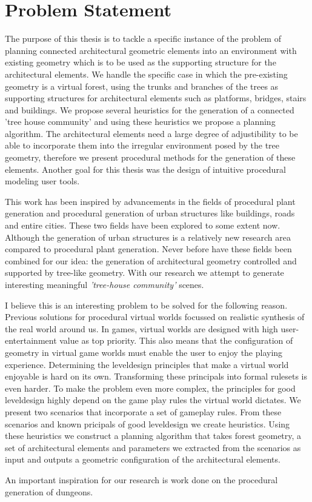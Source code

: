 \chapter{Problem Statement}
\label{sec:problem}


The purpose of this thesis is to tackle a specific instance of the problem of planning connected architectural geometric elements into an environment with existing geometry which is to be used as the supporting structure for the architectural elements. We handle the specific case in which the pre-existing geometry is a virtual forest, using the trunks and branches of the trees as supporting structures for architectural elements such as platforms, bridges, stairs and buildings. We propose several heuristics for the generation of a connected 'tree house community' and using these heuristics we propose a planning algorithm. The architectural elements need a large degree of adjustibility to be able to incorporate them into the irregular environment posed by the tree geometry, therefore we present procedural methods for the generation of these elements. Another goal for this thesis was the design of intuitive procedural modeling user tools.      

This work has been inspired by advancements in the fields of procedural plant generation and procedural generation of urban structures like buildings, roads and entire cities. These two fields have been explored to some extent now. Although the generation of urban structures is a relatively new research area compared to procedural plant generation. Never before have these fields been combined for our idea: the generation of architectural geometry controlled and supported by tree-like geometry. With our research we attempt to 
generate interesting meaningful \emph{'tree-house community'} scenes.

I believe this is an interesting problem to be solved for the following reason. Previous solutions for procedural virtual worlds focussed on realistic synthesis of the real world around us. In games, virtual worlds are designed with high user-entertainment value as top priority. This also means that the configuration of geometry in virtual game worlds must enable the user to enjoy the playing experience. Determining the leveldesign principles that make a virtual world enjoyable is hard on its own. Transforming these principals into formal rulesets is even harder. To make the problem even more complex, the principles for good leveldesign highly depend on the game play rules the virtual world dictates. We present two scenarios that incorporate a set of gameplay rules. From these scenarios and known pricipals of good leveldesign we create heuristics. Using these heuristics we construct a planning algorithm that takes forest geometry, a set of architectural elements and parameters we extracted from the scenarios as input and outputs a geometric configuration of the architectural elements.     

An important inspiration for our research is work done on the procedural generation of dungeons. 

